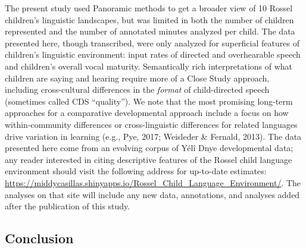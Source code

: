 \documentclass[,man,floatsintext]{apa6}
\begin{document}
The present study used Panoramic methods to get a broader view of 10
Rossel children's linguistic landscapes, but was limited in both the
number of children represented and the number of annotated minutes
analyzed per child. The data presented here, though transcribed, were
only analyzed for superficial features of children's linguistic
environment: input rates of directed and overhearable speech and
children's overall vocal maturity. Semantically rich interpretations of
what children are saying and hearing require more of a Close Study
approach, including cross-cultural differences in the \emph{format} of
child-directed speech (sometimes called CDS \enquote{quality}). We note
that the most promising long-term approaches for a comparative
developmental approach include a focus on how within-community
differences or cross-linguistic differences for related languages drive
variation in learning (e.g., Pye, 2017; Weisleder \& Fernald, 2013). The
data presented here come from an evolving corpus of Yélî Dnye
developmental data; any reader interested in citing descriptive features
of the Rossel child language environment should visit the following
address for up-to-date estimates:
\url{https://middycasillas.shinyapps.io/Rossel_Child_Language_Environment/}.
The analyses on that site will include any new data, annotations, and
analyses added after the publication of this study.

\subsection{Conclusion}\label{disc-conclusion}
\end{document}
